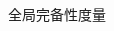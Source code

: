 \documentclass[CJK,final,t]{beamer}
\begin{document}
\begin{frame}{}
\begin{columns}[t]
\begin{column}{.3\linewidth}
\begin{block}{全局完备性度量}
      \end{block}


\end{column}
\end{columns}
\end{frame}
\end{document}
